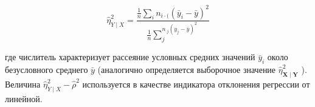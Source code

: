 \documentclass[10pt]{article}
\begin{document}
\[

\hat{\eta}_{Y \mid X}^{2}=\frac{\frac{1}{n} \sum_{i} n_{i \cdot(}\left(\bar{y}_{i}-\bar{y}\right)^{2}}{\frac{1}{n} \sum_{j}^{n_{\cdot j}\left(y_{j}-\bar{y}\right)^{2}}}

\]



где числитель характеризует рассеяние условных средних значений $\bar{y}_{i}$ около безусловного среднего $\bar{y}$ (аналогично определяется выборочное значение $\hat{\eta}_{\boldsymbol{X} \mid \boldsymbol{Y}}^{2}$ ). Величина $\hat{\eta}_{Y \mid X}^{2}-\hat{\rho}^{2}$ используется в качестве индикатора отклонения регрессии от линейной.
\end{document}
